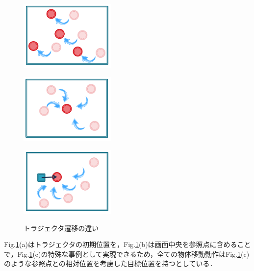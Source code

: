 \begin{figure}[h]
	\centering
	\begin{minipage}[t]{.3\textwidth}
		\centering
		\includegraphics[width=4.7cm]{figure1_sub_a.png} \\ %
		\label{subfigure:2_moving_trajector1}    
	\end{minipage}
	\begin{minipage}[t]{.3\textwidth}
		\centering
		\includegraphics[width=4.7cm]{figure1_sub_b.png} \\ %
		\label{subfigure:2_moving_trajector2}
	\end{minipage}
	\begin{minipage}[t]{.3\textwidth}
		\centering
		\includegraphics[width=4.7cm]{figure1_sub_c.png} \\ %
		\label{subfigure:2_moving_trajector3}
	\end{minipage}
	\caption{トラジェクタ遷移の違い}
	\label{figure:2_moving_trajector}
\end{figure}
Fig.\ref{figure:2_moving_trajector}(a)はトラジェクタの初期位置を，Fig.\ref{figure:2_moving_trajector}(b)は画面中央を参照点に含めることで，Fig.\ref{figure:2_moving_trajector}(c)の特殊な事例として実現できるため，全ての物体移動動作はFig.\ref{figure:2_moving_trajector}(c)のような参照点との相対位置を考慮した目標位置を持つとしている．

